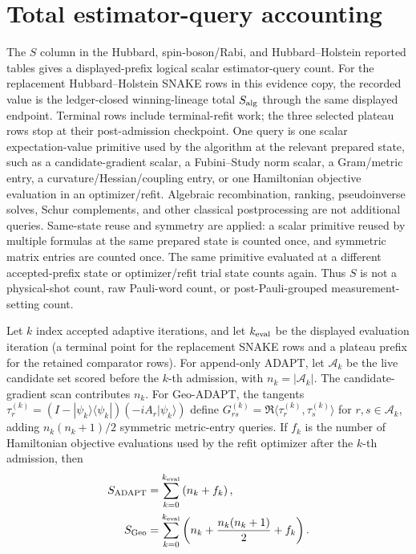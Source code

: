 \documentclass[
  reprint,
  amsmath,
  amssymb,
  aps,
  pra,
  nofootinbib,
  superscriptaddress,
  floatfix
]{revtex4-2}
\begin{document}
\appendix

\section{Total estimator-query accounting}
\label{app:estimator_queries}

The \(S\) column in the Hubbard, spin-boson/Rabi, and Hubbard--Holstein reported tables gives a displayed-prefix logical scalar estimator-query count. For the replacement Hubbard--Holstein SNAKE rows in this evidence copy, the recorded value is the ledger-closed winning-lineage total $S_{\rm alg}$ through the same displayed endpoint. Terminal rows include terminal-refit work; the three selected plateau rows stop at their post-admission checkpoint. One query is one scalar expectation-value primitive used by the algorithm at the relevant prepared state, such as a candidate-gradient scalar, a Fubini--Study norm scalar, a Gram/metric entry, a curvature/Hessian/coupling entry, or one Hamiltonian objective evaluation in an optimizer/refit. Algebraic recombination, ranking, pseudoinverse solves, Schur complements, and other classical postprocessing are not additional queries. Same-state reuse and symmetry are applied: a scalar primitive reused by multiple formulas at the same prepared state is counted once, and symmetric matrix entries are counted once. The same primitive evaluated at a different accepted-prefix state or optimizer/refit trial state counts again. Thus \(S\) is not a physical-shot count, raw Pauli-word count, or post-Pauli-grouped measurement-setting count.

Let \(k\) index accepted adaptive iterations, and let \(k_{\rm eval}\) be the displayed evaluation iteration (a terminal point for the replacement SNAKE rows and a plateau prefix for the retained comparator rows). For append-only ADAPT, let \(\mathcal A_k\) be the live candidate set scored before the \(k\)-th admission, with \(n_k=|\mathcal A_k|\). The candidate-gradient scan contributes \(n_k\). For Geo-ADAPT, the tangents \(\tau_r^{(k)}=(I-|\psi_k\rangle\langle\psi_k|)(-iA_r|\psi_k\rangle)\) define \(G_{rs}^{(k)}=\Re\langle\tau_r^{(k)},\tau_s^{(k)}\rangle\) for \(r,s\in\mathcal A_k\), adding \(n_k(n_k+1)/2\) symmetric metric-entry queries. If \(f_k\) is the number of Hamiltonian objective evaluations used by the refit optimizer after the \(k\)-th admission, then
\begin{equation*}
\begin{aligned}
S_{\rm ADAPT}
&=
\sum_{k=0}^{k_{\rm eval}}
\left(n_k+f_k\right),
\\
S_{\rm Geo}
&=
\sum_{k=0}^{k_{\rm eval}}
\left(n_k+\frac{n_k(n_k+1)}{2}+f_k\right).
\end{aligned}
\end{equation*}
\end{document}
